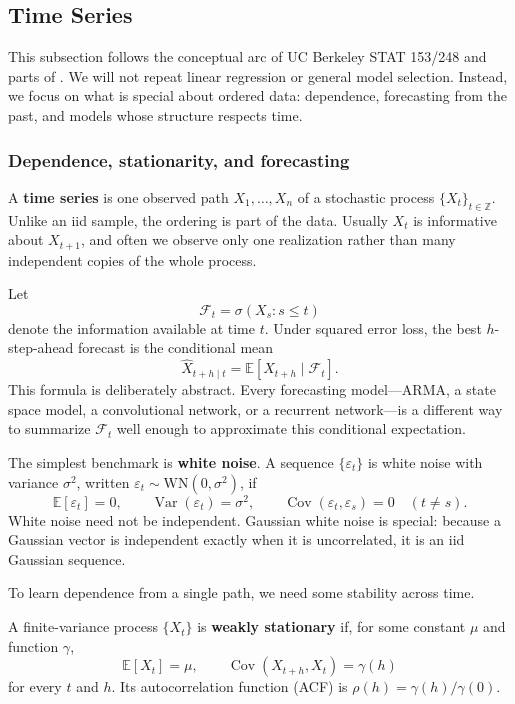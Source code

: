 \subsection{Time Series}
This subsection follows the conceptual arc of UC Berkeley STAT 153/248
\cite{hamilton2026stat153} and parts of \cite{shumway2025time}. We will not repeat
linear regression or general model selection. Instead, we focus on what is
special about ordered data: dependence, forecasting from the past, and models
whose structure respects time.

\subsubsection{Dependence, stationarity, and forecasting}
A \textbf{time series} is one observed path $X_1,\ldots,X_n$ of a stochastic
process $\{X_t\}_{t\in\mathbb{Z}}$. Unlike an iid sample, the ordering is part of
the data. Usually $X_t$ is informative about $X_{t+1}$, and often we observe only
one realization rather than many independent copies of the whole process.

Let
\[
    \mathcal{F}_t=\sigma(X_s:s\leq t)
\]
denote the information available at time $t$. Under squared error loss, the best
$h$-step-ahead forecast is the conditional mean
\[
    \widehat{X}_{t+h\mid t}
    =\mathbb{E}[X_{t+h}\mid\mathcal{F}_t].
\]
This formula is deliberately abstract. Every forecasting model---ARMA, a state
space model, a convolutional network, or a recurrent network---is a different
way to summarize $\mathcal{F}_t$ well enough to approximate this conditional
expectation.

The simplest benchmark is \textbf{white noise}. A sequence $\{\varepsilon_t\}$
is white noise with variance $\sigma^2$, written
$\varepsilon_t\sim\mathrm{WN}(0,\sigma^2)$, if
\[
    \mathbb{E}[\varepsilon_t]=0,\qquad
    \operatorname{Var}(\varepsilon_t)=\sigma^2,\qquad
    \operatorname{Cov}(\varepsilon_t,\varepsilon_s)=0\quad(t\neq s).
\]
White noise need not be independent. Gaussian white noise is special: because a
Gaussian vector is independent exactly when it is uncorrelated, it is an iid
Gaussian sequence.

To learn dependence from a single path, we need some stability across time.

\begin{defn}
A finite-variance process $\{X_t\}$ is \textbf{weakly stationary} if, for some
constant $\mu$ and function $\gamma$,
\[
    \mathbb{E}[X_t]=\mu,
    \qquad
    \operatorname{Cov}(X_{t+h},X_t)=\gamma(h)
\]
for every $t$ and $h$. Its autocorrelation function (ACF) is
$\rho(h)=\gamma(h)/\gamma(0)$.
\end{defn}


